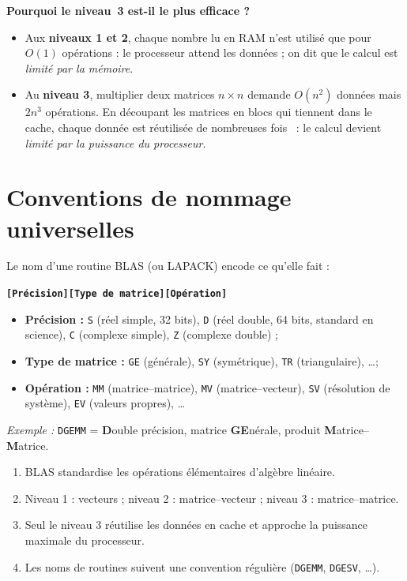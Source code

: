 \documentclass[11pt,a4paper]{report}
\theoremstyle{plain}
\theoremstyle{definition}
\theoremstyle{remark}
\begin{document}
\noindent\textbf{Pourquoi le niveau~3 est-il le plus efficace ?}
\begin{itemize}
    \item Aux \textbf{niveaux 1 et 2}, chaque nombre lu en RAM n'est utilisé que pour $O(1)$ opérations : le processeur attend les données ; on dit que le calcul est \emph{limité par la mémoire}.
    \item Au \textbf{niveau 3}, multiplier deux matrices $n\times n$ demande $O(n^2)$ données mais $2n^3$ opérations. En découpant les matrices en blocs qui tiennent dans le cache, chaque donnée est réutilisée de nombreuses fois~\cite{goto2008} : le calcul devient \emph{limité par la puissance du processeur}.
\end{itemize}

\section{Conventions de nommage universelles}

Le nom d'une routine BLAS (ou LAPACK) encode ce qu'elle fait :
\begin{center}
\textbf{\texttt{[Précision][Type de matrice][Opération]}}
\end{center}
\begin{itemize}
    \item \textbf{Précision :} \texttt{S} (réel simple, 32 bits), \texttt{D} (réel double, 64 bits, standard en science), \texttt{C} (complexe simple), \texttt{Z} (complexe double) ;
    \item \textbf{Type de matrice :} \texttt{GE} (générale), \texttt{SY} (symétrique), \texttt{TR} (triangulaire), \dots ;
    \item \textbf{Opération :} \texttt{MM} (matrice--matrice), \texttt{MV} (matrice--vecteur), \texttt{SV} (résolution de système), \texttt{EV} (valeurs propres), \dots
\end{itemize}
\textit{Exemple :} \texttt{DGEMM} = \textbf{D}ouble précision, matrice \textbf{GE}nérale, produit \textbf{M}atrice--\textbf{M}atrice.

\begin{encadreresume}
\begin{enumerate}
    \item BLAS standardise les opérations élémentaires d'algèbre linéaire.
    \item Niveau 1 : vecteurs ; niveau 2 : matrice--vecteur ; niveau 3 : matrice--matrice.
    \item Seul le niveau 3 réutilise les données en cache et approche la puissance maximale du processeur.
    \item Les noms de routines suivent une convention régulière (\texttt{DGEMM}, \texttt{DGESV}, \dots).
\end{enumerate}
\end{encadreresume}
\end{document}
